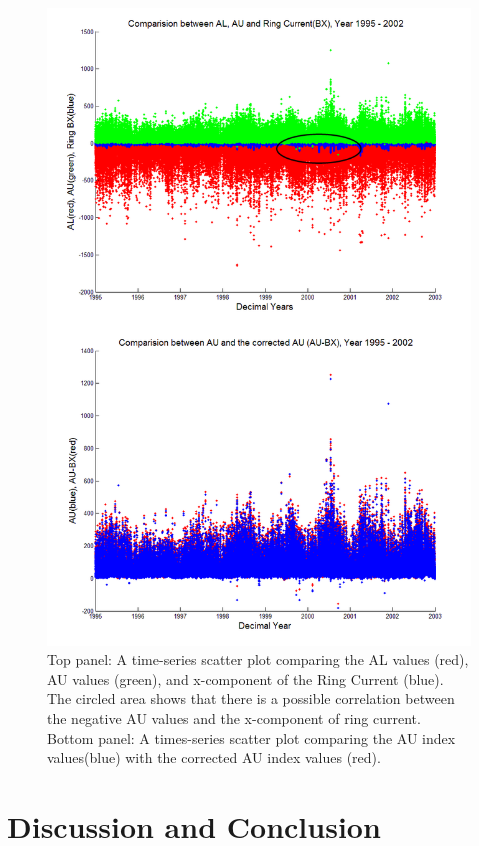 \documentclass[12pt]{report} %
\begin{document}
\begin{figure}
\centering
 \vspace{-20pt}
    \includegraphics[width=\textwidth]{./comparingAE}
 \vspace{-30pt}
  \caption{Top panel: A time-series scatter plot comparing the AL values (red), AU values (green), and x-component of the Ring Current (blue). The circled area shows that there is a possible correlation between the negative AU values and the x-component of ring current. Bottom panel: A times-series scatter plot comparing the AU index values(blue) with the corrected AU index values (red).} \label{fig:comparingAE}
 \end{figure} 

\chapter{Discussion and Conclusion}\label{chap:discussion}
\end{document}
